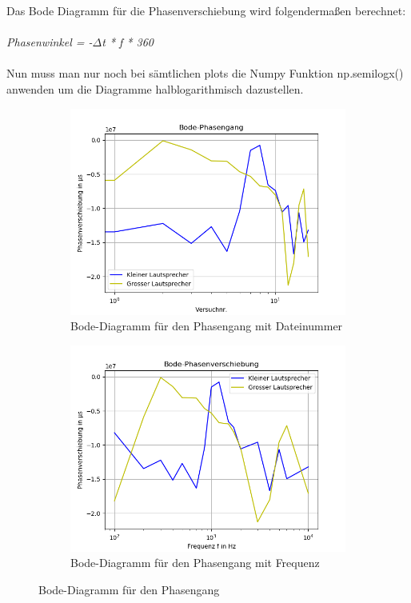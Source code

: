 \documentclass[12pt, oneside, a4paper, \docLanguage]{report}
\begin{document}
\newpage
Das Bode Diagramm für die Phasenverschiebung wird folgendermaßen berechnet:
\\~\\
\textit{Phasenwinkel = -$\Delta$t * f * 360} 
\\~\\
Nun muss man nur noch bei sämtlichen plots die Numpy Funktion np.semilogx() anwenden um die Diagramme halblogarithmisch dazustellen.
\begin{figure}[H]
\centering
\begin{subfigure}{.5\textwidth}
  \centering
  \includegraphics[width=0.9\linewidth]{../data/img/bodephasenanzahl.png}
  \caption{Bode-Diagramm für den Phasengang mit Dateinummer}
  \label{fig:Bode-Diagramm fürden Phasengang mit Dateinummer}
\end{subfigure}%
\begin{subfigure}{.5\textwidth}
  \centering
  \includegraphics[width=0.9\linewidth]{../data/img/bodephasenfrequenz.png}
  \caption{Bode-Diagramm für den Phasengang mit Frequenz}
  \label{fig:Bode-Diagramm für den Phasengang mit Frequenz}
\end{subfigure}
\caption{Bode-Diagramm für den Phasengang}
\label{fig:Bode-Diagramm für den Phasengang}
\end{figure}
\end{document}
